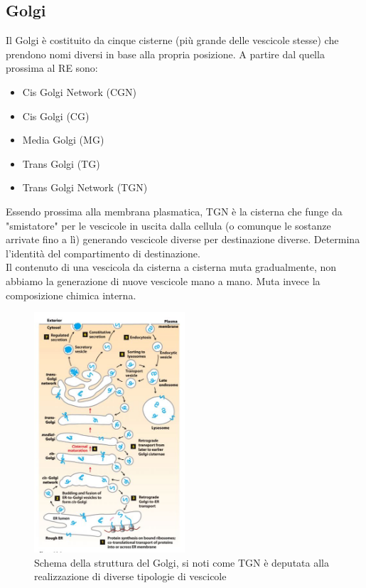    \subsection{Golgi}
        Il Golgi è costituito da cinque cisterne (più grande delle vescicole stesse) che prendono nomi diversi in base alla propria posizione. A partire dal quella prossima al RE sono:
        \begin{itemize}
            \item Cis Golgi Network (CGN)
            \item Cis Golgi (CG)
            \item Media Golgi (MG)
            \item Trans Golgi (TG)
            \item Trans Golgi Network (TGN)
        \end{itemize}
        Essendo prossima alla membrana plasmatica, TGN è la cisterna che funge da "smistatore" per le vescicole in uscita dalla cellula (o comunque le sostanze arrivate fino a lì) generando vescicole diverse per destinazione diverse. 
        Determina l'identità del compartimento di destinazione.\\
        Il contenuto di una vescicola da cisterna a cisterna muta gradualmente, non abbiamo la generazione di nuove vescicole mano a mano. Muta invece la composizione chimica interna.
        \begin{figure}[h]
            \centering
            \includegraphics[width=0.5\textwidth]{images/Golgi.JPG}
            \caption{\small Schema della struttura del Golgi, si noti come TGN è deputata alla realizzazione di diverse tipologie di vescicole}
            \label{fig:mesh1}
        \end{figure}
